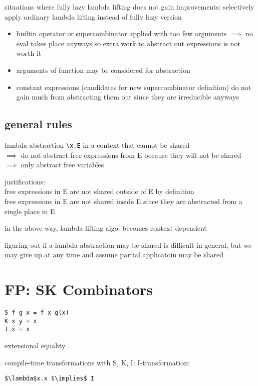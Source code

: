 \documentclass[8pt]{extarticle}
\begin{document}
\begin{multicols*}{2}
situations where fully lazy lambda lifting does not gain improvements: selectively apply ordinary lambda lifting instead of fully lazy version
\begin{itemize}
\item builtin operator or supercombinator applied with too few arguments $\implies$ no eval takes place anyways so extra work to abstract out expressions is not worth it
\item arguments of function may be considered for abstraction
\item constant expressions (candidates for new supercombinator definition) do not gain much from abstracting them out since they are irreducible anyways
\end{itemize}

\subsection{general rules}
lambda abstraction \verb|\x.E| in a context that cannot be shared\\
$\implies$ do not abstract free expressions from E because they will not be shared\\
$\implies$ only abstract free variables

justifications:\\
free expressions in E are not shared outside of E by definition\\
free expressions in E are not shared inside E since they are abstracted from a single place in E

in the above way, lambda lifting algo. becomes context dependent

figuring out if a lambda abstraction may be shared is difficult in general, but we may give up at any time and assume partial applicatoin may be shared

\vfill\null
\columnbreak

\section{FP: SK Combinators}

\begin{lstlisting}
S f g x = f x g(x)
K x y = x
I x = x
\end{lstlisting}

extensional equality

compile-time transformations with S, K, I:
I-transformation:
\begin{lstlisting}
$\lambda$x.x $\implies$ I
\end{lstlisting}


\end{multicols*}
\end{document}
